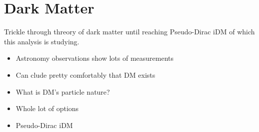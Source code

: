 \chapter{Dark Matter}
\label{chapter:dm}

Trickle through threory of dark matter until reaching Pseudo-Dirac iDM of which
this analysis is studying.

\begin{itemize}
    \item Astronomy observations show lots of measurements
    \item Can clude pretty comfortably that DM exists
    \item What is DM's particle nature?
    \item Whole lot of options
    \item Pseudo-Dirac iDM
\end{itemize}

